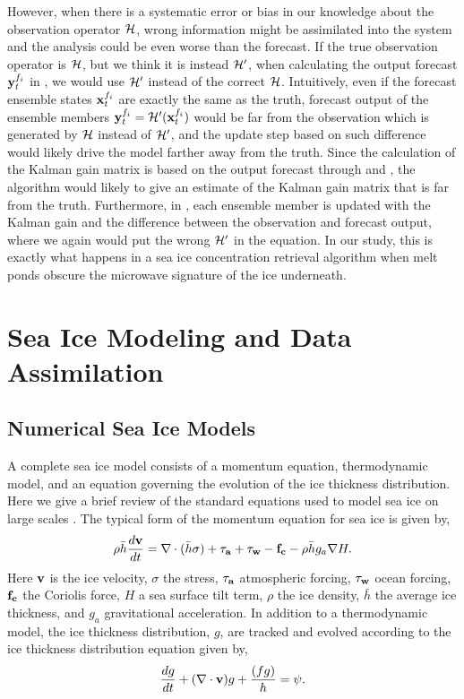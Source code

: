\par However, when there is a systematic error or bias in our knowledge about the observation operator $\mathcal{H}$, wrong information might be assimilated into the system and the analysis could be even worse than the forecast. If the true observation operator is $\mathcal{H}$, but we think it is instead $\mathcal{H}'$, when calculating the output forecast $\textbf{y}_t^{f_i}$ in , we would use $\mathcal{H}'$ instead of the correct $\mathcal{H}$. Intuitively, even if the forecast ensemble states $\textbf{x}_t^{f_i}$ are exactly the same as the truth, forecast output of the ensemble members $\textbf{y}_t^{f_i}=\mathcal{H}'(\textbf{x}_t^{f_i})$ would be far from the observation which is generated by $\mathcal{H}$ instead of $\mathcal{H}'$, and the update step based on such difference would likely drive the model farther away from the truth. Since the calculation of the Kalman gain matrix  is based on the output forecast through  and , the algorithm would likely to give an estimate of the Kalman gain matrix that is far from the truth. Furthermore, in , each ensemble member is updated with the Kalman gain and the difference between the observation and forecast output, where we again would put the wrong $\mathcal{H}'$ in the equation. In our study, this is exactly what happens in a sea ice concentration retrieval algorithm when melt ponds obscure the microwave signature of the ice underneath.

\section{ Sea Ice Modeling and Data Assimilation}
\subsection{Numerical Sea Ice Models}\label{sec:numericalmodels}
\par A complete sea ice model consists of a momentum equation, thermodynamic model, and an equation governing the evolution of the ice thickness distribution. Here we give a brief review of the standard equations used to model sea ice on large scales \cite{osti_1364126}. The typical form of the momentum equation for sea ice is given by,
\begin{align}\label{Icemomentum}
    \rho \bar{h}\frac{d{\bf v}}{dt}=\nabla\cdot(\bar{h} {\bf \sigma})+{\bf \tau_a}+{\bf \tau_w}-{\bf f_c}-\rho\bar{h}g_a\nabla H.
\end{align}
Here ${\bf v}$ is the ice velocity, ${\sigma}$ the stress, ${\bf \tau_a}$ atmospheric forcing, ${\bf \tau_w}$ ocean forcing, ${\bf f_c}$ the Coriolis force, $H$ a sea surface tilt term, $\rho$ the ice density, $\bar{h}$ the average ice thickness, and $g_a$ gravitational acceleration. In addition to a thermodynamic model, the ice thickness distribution, $g$, are tracked and evolved according to the ice thickness distribution equation \cite{Thorndike1975} given by,
\begin{align}\label{ITD}
    \frac{dg}{dt}+(\nabla \cdot {\bf v})g+\frac{(fg)}{h}=\psi.
\end{align}

